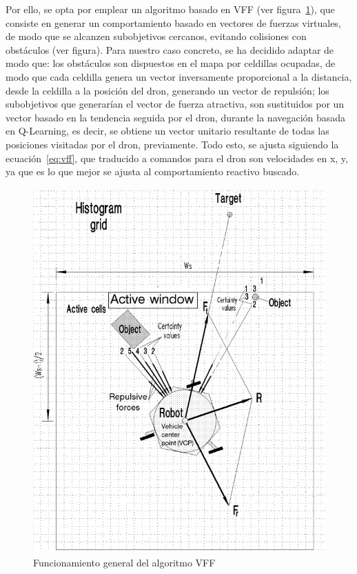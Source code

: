 Por ello, se opta por emplear un algoritmo basado en \ac{VFF} (ver figura~\ref{fig:vffwork}), que consiste en generar un comportamiento basado en vectores de fuerzas virtuales, de modo que se alcanzen subobjetivos cercanos, evitando colisiones con obstáculos (ver figura). Para nuestro caso concreto, se ha decidido adaptar de modo que: los obstáculos son dispuestos en el mapa por celdillas ocupadas, de modo que cada celdilla genera un vector inversamente proporcional a la distancia, desde la celdilla a la posición del dron, generando un vector de repulsión; los subobjetivos que generarían el vector de fuerza atractiva, son sustituidos por un vector basado en la tendencia seguida por el dron, durante la navegación basada en Q-Learning, es decir, se obtiene un vector unitario resultante de todas las posiciones visitadas por el dron, previamente. Todo esto, se ajusta siguiendo la ecuación~\ref{eq:vff}, que traducido a comandos para el dron son velocidades en x, y, ya que es lo que mejor se ajusta al comportamiento reactivo buscado.
\begin{figure} [tp]
    \begin{center}
    \includegraphics[height=14cm]{imagenes/cap4/30_vff.png}
    \end{center}
    \caption[Funcionamiento general del algoritmo \ac{VFF}]{Funcionamiento general del algoritmo \ac{VFF}}
    \label{fig:vffwork}
\end{figure}

